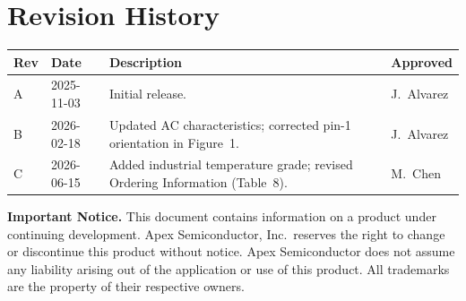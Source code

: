 \section{Revision History}
\begin{center}
\begin{tabular}{@{}C{1.1cm}C{2.1cm}L{8.4cm}C{2.6cm}@{}}
\toprule
{}
{\footnotesize\bfseries Rev} & {\footnotesize\bfseries Date} & {\footnotesize\bfseries Description} & {\footnotesize\bfseries Approved} \\
\midrule
A & 2025-11-03 & Initial release. & J.\ Alvarez \\
B & 2026-02-18 & Updated AC characteristics; corrected pin-1 orientation in Figure~1. & J.\ Alvarez \\
C & 2026-06-15 & Added industrial temperature grade; revised Ordering Information (Table~8). & M.\ Chen \\
\bottomrule
\end{tabular}
\end{center}

\vspace{10pt}
\begin{tcolorbox}[colback=lightbg, colframe=lightbg!60!black, boxrule=0.4pt, arc=1pt,
  left=8pt, right=8pt, top=6pt, bottom=6pt]
{\footnotesize\color{neutral}\textbf{Important Notice.} This document contains
information on a product under continuing development. Apex Semiconductor,
Inc.\ reserves the right to change or discontinue this product without
notice. Apex Semiconductor does not assume any liability arising out of the
application or use of this product. All trademarks are the property of their
respective owners.}
\end{tcolorbox}
